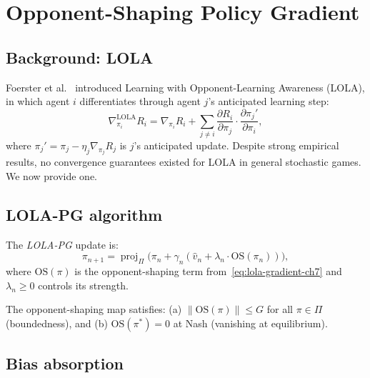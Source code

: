 \section{Opponent-Shaping Policy Gradient}
\label{sec:lola-convergence}

\subsection{Background: LOLA}

Foerster et al.~\cite{foerster2018lola} introduced Learning with Opponent-Learning Awareness (LOLA), in which agent $i$ differentiates through agent $j$'s anticipated learning step:
\begin{equation}
\label{eq:lola-gradient-ch7}
    \nabla_{\pi_i}^{\text{LOLA}} R_i = \nabla_{\pi_i} R_i + \sum_{j \neq i} \frac{\partial R_i}{\partial \pi_j} \cdot \frac{\partial \pi_j'}{\partial \pi_i},
\end{equation}
where $\pi_j' = \pi_j - \eta_j \nabla_{\pi_j} R_j$ is $j$'s anticipated update. Despite strong empirical results, no convergence guarantees existed for LOLA in general stochastic games. We now provide one.

\subsection{LOLA-PG algorithm}

\begin{definition}[LOLA-PG]
\label{def:lola-pg-ch7}
The \emph{LOLA-PG} update is:
\begin{equation}
\label{eq:lola-pg-ch7}
\tag{LOLA-PG}
    \pi_{n+1} = \operatorname{proj}_\Pi\bigl(\pi_n + \gamma_n(\hat{v}_n + \lambda_n \cdot \mathrm{OS}(\pi_n))\bigr),
\end{equation}
where $\mathrm{OS}(\pi)$ is the opponent-shaping term from~\eqref{eq:lola-gradient-ch7} and $\lambda_n \geq 0$ controls its strength.
\end{definition}

The opponent-shaping map satisfies: (a) $\|\mathrm{OS}(\pi)\| \leq G$ for all $\pi \in \Pi$ (boundedness), and (b) $\mathrm{OS}(\pi^*) = 0$ at Nash (vanishing at equilibrium).

\subsection{Bias absorption}

